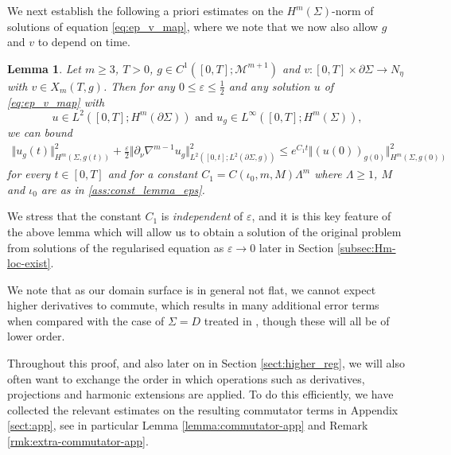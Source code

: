 \documentclass[10pt,reqno]{amsart}
\theoremstyle{plain}
\newtheorem{lemma}{Lemma}[section]
\theoremstyle{definition}
\numberwithin{equation}{section}
\newcommand{\La}{\Lambda}
\newcommand{\Si}{\Sigma}
\newcommand{\ep}{\varepsilon}
\newcommand{\norm}[1]{\Vert#1\Vert}
\newcommand{\beq}{\begin{equation}}
\newcommand{\eeq}{\end{equation}}
\newcommand{\beqa}{\begin{equation}\begin{aligned}}
\newcommand{\eeqa}{\end{aligned}\end{equation}}
\newcommand{\eps}{\varepsilon}
\newcommand{\MM}{\mathcal{M}} %
\newcommand{\hf}{\frac{1}{2}} %
\newcommand{\p}{\partial} %
\begin{document}
We next establish the following a priori estimates on the $H^m(\Si)$-norm of solutions of equation \eqref{eq:ep_v_map}, where we note that we now also allow $g$ and $v$ to depend on time. 

\begin{lemma}\label{lemma:ep_Hm_apriori}
    Let $m \geq 3$, $T>0$, $g \in C^1([0,T];\MM^{m+1})$ and $v:[0,T]\times\p\Si \rightarrow N_\eta$ with $v \in X_m(T,g)$. Then for any $0\leq \ep \leq \hf$ and any solution $u$ of \eqref{eq:ep_v_map} with 
    \beq\label{ass:reg-for-est}
        u\in  L^2([0,T];H^m(\p\Si)) \text{ and } u_g\in  L^\infty([0,T];H^m(\Si)), %
    \eeq
    we can bound
    \beqa\label{est:time_ind_Hm}\norm{u_g(t)}_{H^m(\Si,g(t))}^2 + \tfrac{\eps}{2} \norm{\p_\nu \nabla^{m-1} u_g}_{L^2([0,t]; L^2(\p\Si,g))}^2 \leq e^{C_{1} t}\norm{(u(0))_{g(0)}}_{H^m(\Si,g(0))}^2
    \eeqa
    for every $t\in [0,T]$ and for a constant $C_{1}=C(\iota_0,m,M)\La^{m}$ where $\La\geq 1$, $M$ and $\iota_0$ are as in \eqref{ass:const_lemma_eps}. 
\end{lemma}

We stress that the constant $C_1$ is \emph{independent} of $\ep$, and it is this key feature of the above lemma which will allow us to obtain a solution of the original problem from solutions of the regularised equation as  $\eps\to 0$ later in Section \ref{subsec:Hm-loc-exist}.

We note that as our domain surface is in general not flat, we cannot expect higher derivatives to commute, which results in many additional error terms when compared with the case of $\Si=D$ treated in \cite{S}, though these will all be of lower order. 

Throughout this proof, and also later on in Section \ref{sect:higher_reg}, we will also often want to exchange the order in which operations such as derivatives, projections and harmonic extensions are applied. To do this efficiently, we have collected the relevant estimates on the resulting commutator terms in Appendix \ref{sect:app}, see in particular Lemma \ref{lemma:commutator-app} and Remark \ref{rmk:extra-commutator-app}.
\end{document}
